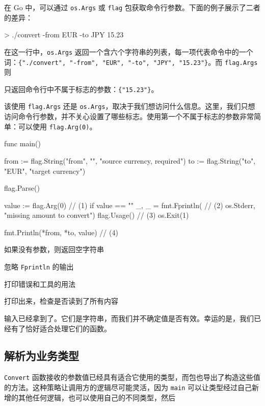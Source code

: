 在 Go 中，可以通过 \texttt{os.Args} 或 \texttt{flag} 包获取命令行参数。下面的例子展示了二者的差异：

\begin{shellcode}[]
> ./convert -from EUR -to JPY 15.23
\end{shellcode}

在这一行中，\texttt{os.Args} 返回一个含六个字符串的列表，每一项代表命令中的一个词：\texttt{\{"./convert", "-from", "EUR", "-to", "JPY", "15.23"\}}。而 \texttt{flag.Args} 则

只返回命令行中不属于标志的参数：\texttt{\{"15.23"\}}。

该使用 \texttt{flag.Args} 还是 \texttt{os.Args}，取决于我们想访问什么信息。这里，我们只想访问命令行参数，并不关心设置了哪些标志。使用第一个不属于标志的参数非常简单：可以使用 \texttt{flag.Arg(0)}。

\begin{gocode}[title={代码清单 6.27 \texttt{main.go}：获取程序的第一个参数}]
func main() {
    from := flag.String("from", "", "source currency, required")
    to := flag.String("to", "EUR", "target currency")

    flag.Parse()

    value := flag.Arg(0) // (1)
    if value == "" {
        _, _ = fmt.Fprintln( // (2)
            os.Stderr, "missing amount to convert")
        flag.Usage() // (3)
        os.Exit(1)
    }

    fmt.Println(*from, *to, value) // (4)
}
\end{gocode}

\begin{codeannotations}
\item 如果没有参数，则返回空字符串
\item 忽略 \texttt{Fprintln} 的输出
\item 打印错误和工具的用法
\item 打印出来，检查是否读到了所有内容
\end{codeannotations}

输入已经拿到了。它们是字符串，而我们并不确定值是否有效。幸运的是，我们已经有了恰好适合处理它们的函数。

\subsection{解析为业务类型}

\texttt{Convert} 函数接收的参数值已经具有适合它使用的类型，而包也导出了构造这些值的方法。这种策略让调用方的逻辑尽可能灵活，因为 \texttt{main} 可以让类型经过自己新增的其他任何逻辑，也可以使用自己的不同类型，然后

